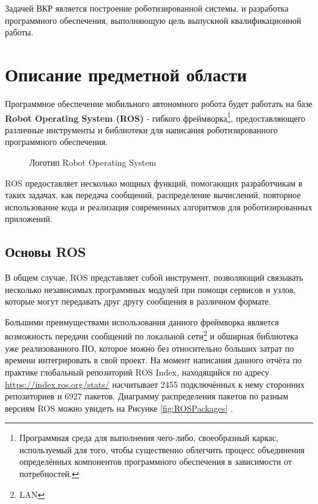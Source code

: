 \documentclass[12pt,a4paper]{scrartcl}
\begin{document}
			Задачей ВКР является построение роботизированной системы, и разработка программного обеспечения, выполняющую цель выпускной квалификационной работы.
			
		\section{Описание предметной области} \label{sec:Description}
			Программное обеспечение мобильного автономного робота будет работать на базе \textbf{Robot Operating System (ROS)} - гибкого фреймворка\footnote{Программная среда для выполнения чего-либо, своеобразный каркас, используемый для того, чтобы существенно облегчить процесс объединения определённых компонентов программного обеспечения в зависимости от потребностей\cite{bib:FrameworkDefinition}.}, предоставляющего различные инструменты и библиотеки для написания роботизированного программного обеспечения. 
			
			\begin{figure}[h]
				\caption{Логотип Robot Operating System}
				\label{fig:ROSLogo}
			\end{figure}
			
			ROS предоставляет несколько мощных функций, помогающих разработчикам в таких задачах, как передача сообщений, распределение вычислений, повторное использование кода и реализация современных алгоритмов для роботизированных приложений\cite{bib:ROSDefinition}.
			
			\subsection{Основы ROS}
				В общем случае, ROS представляет собой инструмент, позволяющий связывать несколько независимых программных модулей при помощи сервисов и узлов, которые могут передавать друг другу сообщения в различном формате.
				
				Большими преимуществами использования данного фреймворка является возможность передачи сообщений по локальной сети\footnote{LAN} и обширная библиотека уже реализованного ПО, которое можно без относительно больших затрат по времени интегрировать в свой проект. На момент написания данного отчёта по практике глобальный репозиторий ROS Index, находящийся по адресу \href{https://index.ros.org/stats/}{https://index.ros.org/stats/} насчитывает 2455 подключённых к нему сторонних репозиториев и 6927 пакетов. Диаграмму распределения пакетов по разным версиям ROS можно увидеть на Рисунке \ref{fig:ROSPackages} .
				
\end{document}
